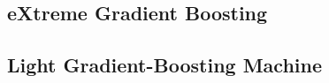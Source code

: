 \subsection{eXtreme Gradient Boosting}
\lipsum[1-10]
\subsection{Light Gradient-Boosting Machine}
\lipsum[1-7]